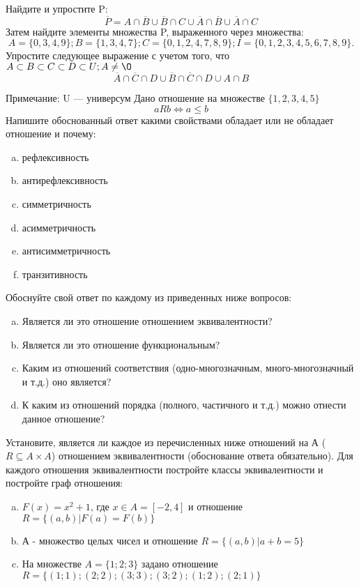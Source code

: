 \documentclass[10pt]{exam}
\begin{document}
\begin{questions}
\question
Найдите и упростите P:
\begin{equation*}
\overline{P} = A \cap \overline{B} \cup \overline{B} \cap C \cup \overline{A} \cap \overline{B} \cup \overline{A} \cap C
\end{equation*}
Затем найдите элементы множества P, выраженного через множества:
\begin{equation*}
A = \{0, 3, 4, 9\}; 
B = \{1, 3, 4, 7\};
C = \{0, 1, 2, 4, 7, 8, 9\};
I = \{0, 1, 2, 3, 4, 5, 6, 7, 8, 9\}.
\end{equation*}\question
Упростите следующее выражение с учетом того, что $A\subset B \subset C \subset D \subset U; A \neq \O$
\begin{equation*}
\overline{A} \cap \overline{C} \cap D \cup \overline{B} \cap \overline{C} \cap D \cup A \cap B
\end{equation*}

Примечание: U — универсум\question
Дано отношение на множестве $\{1, 2, 3, 4, 5\}$ 
\begin{equation*}
aRb \iff a \leq b
\end{equation*}
Напишите обоснованный ответ какими свойствами обладает или не обладает отношение и почему:   
\begin{enumerate} [a)]\setcounter{enumi}{0}
\item рефлексивность
\item антирефлексивность
\item симметричность
\item асимметричность
\item антисимметричность
\item транзитивность
\end{enumerate}

Обоснуйте свой ответ по каждому из приведенных ниже вопросов:
\begin{enumerate} [a)]\setcounter{enumi}{0}
    \item Является ли это отношение отношением эквивалентности?
    \item Является ли это отношение функциональным?
    \item Каким из отношений соответствия (одно-многозначным, много-многозначный и т.д.) оно является?
    \item К каким из отношений порядка (полного, частичного и т.д.) можно отнести данное отношение?
\end{enumerate}


\question
Установите, является ли каждое из перечисленных ниже отношений на А ($R \subseteq A \times A$) отношением эквивалентности (обоснование ответа обязательно). Для каждого отношения эквивалентности постройте классы эквивалентности и постройте граф отношения:
\begin{enumerate} [a)]\setcounter{enumi}{0}
\item $F(x)=x^{2}+1$, где $x \in A = [-2, 4]$ и отношение $R = \{(a,b)|F(a) = F(b)\}$
\item А - множество целых чисел и отношение $R = \{(a,b)|a + b = 5\}$
\item На множестве $A = \{1; 2; 3\}$ задано отношение $R = \{(1; 1); (2; 2); (3; 3); (3; 2); (1; 2); (2; 1)\}$


\end{enumerate}
\end{questions}
\end{document}
